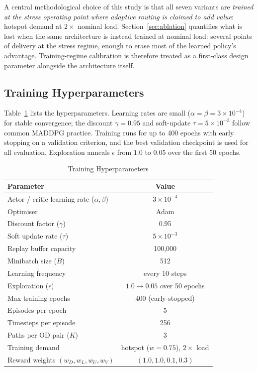 \documentclass[10pt,journal,comsoc]{IEEEtran}
\begin{document}
A central methodological choice of this study is that all seven variants are \emph{trained at the stress operating point where adaptive routing is claimed to add value}: hotspot demand at $2\times$ nominal load. Section~\ref{sec:ablation} quantifies what is lost when the same architecture is instead trained at nominal load: several points of delivery at the stress regime, enough to erase most of the learned policy's advantage. Training-regime calibration is therefore treated as a first-class design parameter alongside the architecture itself.

\subsection{Training Hyperparameters}
Table~\ref{tab:training_params} lists the hyperparameters. Learning rates are small ($\alpha=\beta=3\times10^{-4}$) for stable convergence; the discount $\gamma=0.95$ and soft-update $\tau=5\times10^{-3}$ follow common MADDPG practice. Training runs for up to 400 epochs with early stopping on a validation criterion, and the best validation checkpoint is used for all evaluation. Exploration anneals $\epsilon$ from $1.0$ to $0.05$ over the first 50 epochs.

\begin{table}[!t]
  \centering
  \caption{Training Hyperparameters}
  \label{tab:training_params}
  \begin{tabular}{lc}
    \toprule
    \textbf{Parameter} & \textbf{Value} \\
    \midrule
    Actor / critic learning rate ($\alpha,\beta$) & $3\times10^{-4}$ \\
    Optimiser & Adam \\
    Discount factor ($\gamma$) & 0.95 \\
    Soft update rate ($\tau$) & $5\times10^{-3}$ \\
    Replay buffer capacity & 100{,}000 \\
    Minibatch size ($B$) & 512 \\
    Learning frequency & every 10 steps \\
    Exploration ($\epsilon$) & $1.0 \rightarrow 0.05$ over 50 epochs \\
    Max training epochs & 400 (early-stopped) \\
    Episodes per epoch & 5 \\
    Timesteps per episode & 256 \\
    Paths per OD pair ($K$) & 3 \\
    Training demand & hotspot ($w=0.75$), $2\times$ load \\
    Reward weights $(w_D,w_L,w_U,w_V)$ & $(1.0,1.0,0.1,0.3)$ \\
    \bottomrule
  \end{tabular}
\end{table}
\end{document}
